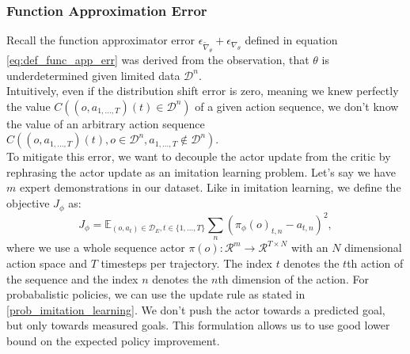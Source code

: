 \subsubsection{Function Approximation Error}
\label{func_app_error}
Recall the function approximator error $\epsilon_{\widetilde{\nabla}_{\theta}} + \epsilon_{\nabla_{\theta}}$ defined in equation \ref{eq:def_func_app_err} was 
derived from the observation, that $\theta$ is underdetermined 
given limited data $\mathcal{D}^n$. \\
Intuitively, even if the distribution shift error is zero, meaning we knew perfectly the value 
$C((o, a_{1,...,T})(t) \in \mathcal{D}^n)$ of a given action sequence, we don't know the value of an arbitrary action sequence
$C((o, a_{1,...,T})(t), o \in \mathcal{D}^n, a_{1,...,T} \notin \mathcal{D}^n)$.\\
To mitigate this error, we want to decouple the actor update from the critic by rephrasing the actor update as an imitation learning problem. 
Let's say we have $m$ expert demonstrations in our dataset. 
Like in imitation learning, we define the objective $J_{\phi}$ as:
\begin{equation}
    \label{eq:ac_obj_1}
    J_{\phi} = \mathbb{E}_{(o, a_{t}) \in \mathcal{D}_E, t \in \{1, ..., T\}}\sum_n \left(\pi_{\phi}(o)_{t, n} - a_{t, n}\right)^2,
\end{equation}
where we use a whole sequence actor 
$\pi(o):\mathcal{R}^m \rightarrow \mathcal{R}^{T \times N}$ with an $N$ dimensional action space and $T$ timesteps per trajectory. The index $t$ denotes the $t$th action of the sequence and the index $n$ denotes the $n$th dimension of 
the action. For probabalistic policies, we can use the update rule as stated in \ref{prob_imitation_learning}. We don't push the actor towards a predicted goal, 
but only towards measured goals. This formulation allows us to use good lower bound on the expected policy improvement.\\

